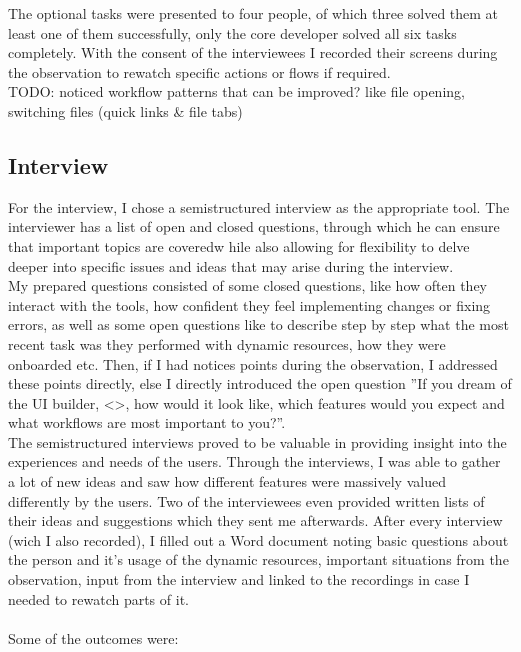 The optional tasks were presented to four people, of which three solved them at least one of them successfully, only the core developer solved all six tasks completely.
With the consent of the interviewees I recorded their screens during the observation to rewatch specific actions or flows if required.
\\
TODO: noticed workflow patterns that can be improved? like file opening, switching files (quick links \& file tabs)

\subsection{Interview}

For the interview, I chose a semistructured interview as the appropriate tool. The interviewer has a list of open and closed questions, through which he can ensure that important topics are coveredw hile also allowing for flexibility to delve deeper into specific issues and ideas that may arise during the interview.
\\
My prepared questions consisted of some closed questions, like how often they interact with the tools, how confident they feel implementing changes or fixing errors, as well as some open questions like to describe step by step what the most recent task was they performed with dynamic resources, how they were onboarded etc.
Then, if I had notices points during the observation, I addressed these points directly, else I directly introduced the open question ''If you dream of the UI builder, <>, how would it look like, which features would you expect and what workflows are most important to you?''.
\\
The semistructured interviews proved to be valuable in providing insight into the experiences and needs of the users. Through the interviews, I was able to gather a lot of new ideas and saw how different features were massively valued differently by the users. Two of the interviewees even provided written lists of their ideas and suggestions which they sent me afterwards. After every interview (wich I also recorded), I filled out a Word document noting basic questions about the person and it's usage of the dynamic resources, important situations from the observation, input from the interview and linked to the recordings in case I needed to rewatch parts of it.
\\\\
Some of the outcomes were:
